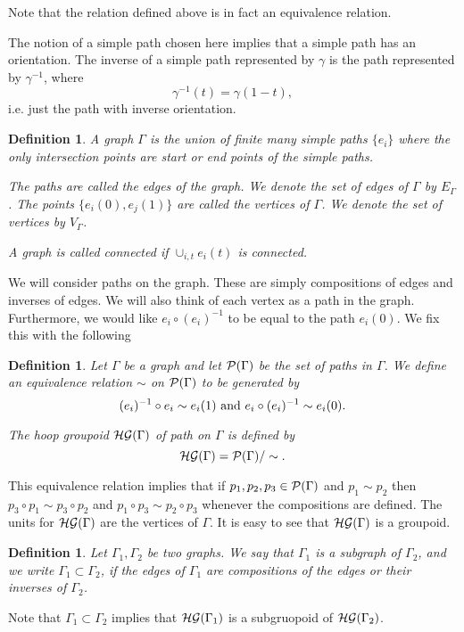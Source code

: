 \documentclass[12pt]{article}
\def\cg{{\cal G}}
\def\ch{{\cal H}}
\def\cp{{\cal P}}
\newtheorem{definition}[thm]{Definition}
\newcommand{\cG}{{\cal G}}
\begin{document}
Note that the relation defined above is in fact an equivalence relation.  

The notion of a simple path  chosen here implies that a simple path has an orientation. The inverse of a simple path represented by $\gamma$ is the path represented by $\gamma^{-1}$, where
$$\gamma^{-1}(t)=\gamma (1-t),$$
i.e. just the path with inverse orientation.


\begin{definition}\label{graph}
A graph $\Gamma$ is the union of finite many simple paths  $\{ e_i\}$ where the only intersection points are start or end points of the simple paths. 

The paths are called the edges of the graph. We denote the set of edges of $\Gamma$ by $E_\Gamma$. The points $\{ e_i(0) ,e_j(1)\}$ are called the vertices of $\Gamma$. We denote the set of vertices by $V_\Gamma$.

A graph is called connected if $\cup_{i,t}e_i (t)$ is connected.
\end{definition}

We will consider paths on the graph. These are simply compositions of edges and inverses of edges. We will also think of each vertex as a path in the graph. Furthermore, we would like $e_i \circ (e_i)^{-1}$ to be equal to the  path $e_i(0)$. We fix this with the following 
\begin{definition}\label{pathgroupoid}
Let $\Gamma$ be a graph and let $\cp (\Gamma )$ be the set of paths in $\Gamma$. We define an equivalence relation $\sim$ on $\cp (\Gamma )$ to be generated by 
$$(e_i)^{-1}\circ e_i \sim e_i(1)\hbox{ and } e_i\circ (e_i)^{-1} \sim e_i(0).$$

The hoop groupoid  $\ch\cG(\Gamma)$  of path on $\Gamma$ is defined by 
$$\ch\cg(\Gamma ) = \cp (\Gamma )/ \sim.$$

\end{definition}

This equivalence relation implies that if $p_1,p_2,p_3\in \cp(\Gamma )$ and $p_1 \sim p_2$ then $p_3\circ p_1\sim p_3 \circ p_2$ and $p_1\circ p_3\sim p_2\circ p_3$ whenever the compositions are defined. The units for $\ch\cg (\Gamma )$ are the vertices of $\Gamma$. It is easy to see that $\ch \cg (\Gamma )$ is a groupoid.

\begin{definition}\label{subgraph}
Let $\Gamma_1 ,\Gamma_2$ be two graphs. We say that $\Gamma_1$ is a subgraph of $\Gamma_2$, and we write $\Gamma_1\subset \Gamma_2$, if the edges of $\Gamma_1$ are compositions of the edges or their inverses of $\Gamma_2$.
\end{definition}
Note that $\Gamma_1 \subset \Gamma_2$ implies that $\ch \cg(\Gamma_1)$ is a subgruopoid of $\ch\cg (\Gamma_2 )$.
\end{document}
